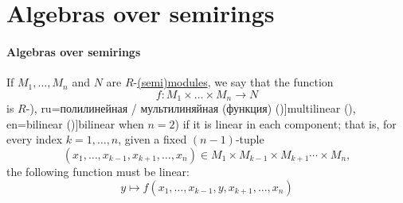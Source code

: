 \section{Algebras over semirings}\label{sec:algebras_over_semirings}

\paragraph{Algebras over semirings}

\begin{definition}\label{def:multilinear_function}
  If \( M_1, \ldots, M_n \) and \( N \) are \( R \)-\hyperref[def:semimodule]{(semi)modules}, we say that the function
  \begin{equation*}
    f: M_1 \times \ldots \times M_n \to N
  \end{equation*}
  is \( R \)-\term[bg=полилинейна (форма) (\cite[243]{ИлинСадовничиСендов1984АнализТом1}), ru=полилинейная / мультилиняйная (функция) (\cite[23]{Тыртышников2017ОсновыАлгебры})]{multilinear} (\term[ru=билинейная (\cite[230]{Тыртышников2017ОсновыАлгебры}), en=bilinear (\cite[344]{Jacobson1985BasicAlgebraI})]{bilinear} when \( n = 2 \)) if it is linear in each component; that is, for every index \( k = 1, \ldots, n \), given a fixed \( (n - 1) \)-tuple
  \begin{equation*}
    (x_1, \ldots, x_{k-1}, x_{k+1}, \ldots, x_n) \in M_1 \times M_{k-1} \times M_{k+1} \cdots \times M_n,
  \end{equation*}
  the following function must be linear:
  \begin{equation*}
    y \mapsto f(x_1, \ldots, x_{k-1}, y, x_{k+1}, \ldots, x_n)
  \end{equation*}
\end{definition}

